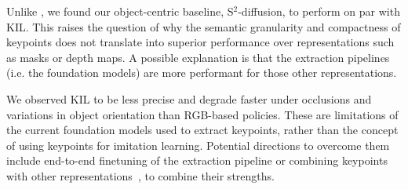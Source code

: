 \documentclass[letterpaper, 10 pt, conference]{ieeeconf}  %
\newcommand{\thomas}[1]{{\color{ForestGreen} TL: #1}}
\begin{document}
Unlike \cite{wang2025skil,Levy2025P3PO}, we found our object-centric baseline, S$^2$-diffusion, to perform on par with KIL. This raises the question of why the semantic granularity and compactness of keypoints does not translate into superior performance over representations such as masks or depth maps. A possible explanation is that the extraction pipelines (i.e. the foundation models) are more performant for those other representations.

We observed KIL to be less precise and degrade faster under occlusions and variations in object orientation than RGB-based policies. These are limitations of the current foundation models used to extract keypoints, rather than the concept of using keypoints for imitation learning. Potential directions to overcome them include end-to-end finetuning of the extraction pipeline or combining keypoints with other representations~\cite{chen2025history-keypoint-IL,cao2025COIL}, to combine their strengths.



\end{document}
